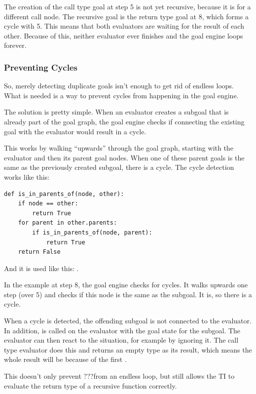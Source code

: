 \documentclass[12pt,halfparskip,DIV11,BCOR10mm]{scrreprt}
\begin{document}
The creation of the call type goal at step 5 is not yet recursive, because it is for a different call node. The recursive goal is the return type goal at 8, which forms a cycle with 5. This means that both evaluators are waiting for the result of each other. Because of this, neither evaluator ever finishes and the goal engine loops forever.

\subsubsection{Preventing Cycles}

So, merely detecting duplicate goals isn't enough to get rid of endless loops. What is needed is a way to prevent cycles from happening in the goal engine.

The solution is pretty simple. When an evaluator creates a subgoal that is already part of the goal graph, the goal engine checks if connecting the existing goal with the evaluator would result in a cycle.

This works by walking ``upwards'' through the goal graph, starting with the evaluator and then its parent goal nodes. When one of these parent goals is the same as the previously created subgoal, there is a cycle. The cycle detection works like this:

\begin{lstlisting}
def is_in_parents_of(node, other):
    if node == other:
        return True
    for parent in other.parents:
        if is_in_parents_of(node, parent):
            return True
    return False
\end{lstlisting}

And it is used like this: .

In the example at step 8, the goal engine checks for cycles. It walks upwards one step (over 5) and checks if this node is the same as the subgoal. It is, so there is a cycle.

When a cycle is detected, the offending subgoal is not connected to the evaluator. In addition,  is called on the evaluator with the  goal state for the subgoal. The evaluator can then react to the situation, for example by ignoring it. The call type evaluator does this and returns an empty type as its result, which means the whole result will be  because of the first .

This doesn't only prevent ???from an endless loop, but still allows the TI to evaluate the return type of a recursive function correctly.
\end{document}
